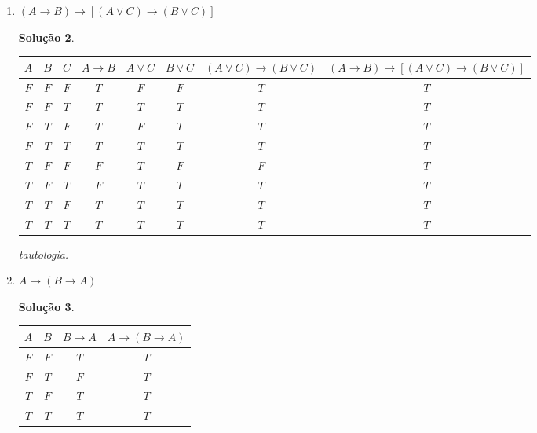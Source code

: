\documentclass[11pt,a4paper]{report}
\newtheorem*{Solucao}{Solu\c{c}\~ao}
\newcommand{\F}{$F$}
\newcommand{\T}{$T$}
\begin{document}
\begin{enumerate}
\begin{enumerate}
\begin{Solucao}
                     contingente.
                   \end{Solucao}
		\item $(A\rightarrow B)\rightarrow[(A\lor
                  C)\rightarrow (B\lor C)]$
                  \begin{Solucao}
                    \verb| |\\
                    \begin{tabular}{|c|c|c|c|c|c|c|c|}
                      \hline
                      $A$ & $B$ & $C$ & $A \to B$ & $A \lor C$ & $B
                      \lor C$ & $(A \lor C) \to (B \lor C)$ & $(A\rightarrow B)\rightarrow[(A\lor
                  C)\rightarrow (B\lor C)]$ \\ \hline
                      \F & \F & \F & \T & \F & \F & \T & \T \\
                      \F & \F & \T & \T & \T & \T & \T & \T \\
                      \F & \T & \F & \T & \F & \T & \T & \T \\
                      \F & \T & \T & \T & \T & \T & \T & \T \\
                      \T & \F & \F & \F & \T & \F & \F & \T \\
                      \T & \F & \T & \F & \T & \T & \T & \T \\
                      \T & \T & \F & \T & \T & \T & \T & \T \\
                      \T & \T & \T & \T & \T & \T & \T & \T \\ \hline
                     \end{tabular}

                     tautologia.
                    \end{Solucao}
		\item $A\rightarrow(B\rightarrow A)$
                  \begin{Solucao}
                    \verb| |\\
                    \begin{tabular}{|c|c|c|c|}
                      \hline
                      $A$ & $B$ & $B \to A$ & $A \to (B \to A)$ \\
                      \hline
                      \F & \F & \T & \T \\
                      \F & \T & \F & \T \\
                      \T & \F & \T & \T \\
                      \T & \T & \T & \T \\ \hline
                    \end{tabular}


\end{Solucao}
\end{enumerate}
\end{enumerate}
\end{document}

